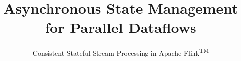 \documentclass{vldb}
\begin{document}

\title{Asynchronous State Management for Parallel Dataflows}
\subtitle{Consistent Stateful Stream Processing in Apache Flink\textsuperscript{TM}}


%
%
%
%


\author{
}
\end{document}
